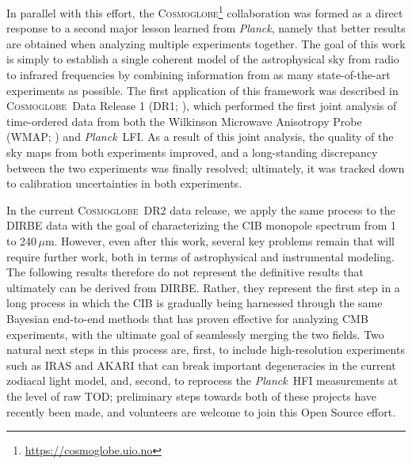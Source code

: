 \documentclass{aa}
\def\Cosmoglobe{\textsc{Cosmoglobe}}
\def\Planck{\textit{Planck}}
\newcommand{\cosmoglobe}{\textsc{Cosmoglobe}}
\begin{document}
In parallel with this effort, the \Cosmoglobe\footnote{\url{https://cosmoglobe.uio.no}} collaboration was formed as a direct response to a second major lesson learned from \Planck, namely that better results are obtained when analyzing multiple experiments together. The goal of this work is simply to establish a single coherent model of the astrophysical sky from radio to infrared frequencies by combining information from as many state-of-the-art experiments as possible. The first application of this framework was described in \cosmoglobe\ Data Release 1 (DR1; \citealp{watts2023_dr1}), which performed the first joint analysis of time-ordered data from both the Wilkinson Microwave Anisotropy Probe (WMAP; \citealp{bennett2012}) and \Planck\ LFI. As a result of this joint analysis, the quality of the sky maps from both experiments improved, and a long-standing discrepancy between the two experiments was finally resolved; ultimately, it was tracked down to calibration uncertainties in both experiments.

In the current \cosmoglobe\ DR2 data release, we apply the same process to the DIRBE data with the goal of characterizing the CIB monopole spectrum from 1 to 240$\,\mu\mathrm{m}$. However, even after this work, several key problems remain that will require further work, both in terms of astrophysical and instrumental modeling. The following results therefore do not represent the definitive results that ultimately can be derived from DIRBE. Rather, they represent the first step in a long process in which the CIB is gradually being harnessed through the same Bayesian end-to-end methods that has proven effective for analyzing CMB experiments, with the ultimate goal of seamlessly merging the two fields. Two natural next steps in this process are, first, to include high-resolution experiments such as IRAS \citep{neugebauer:1984} and AKARI \citep{murakami:2007} that can break important degeneracies in the current zodiacal light model, and, second, to reprocess the \Planck\ HFI measurements at the level of raw TOD; preliminary steps towards both of these projects have recently been made, and volunteers are welcome to join this Open Source effort.

\end{document}
